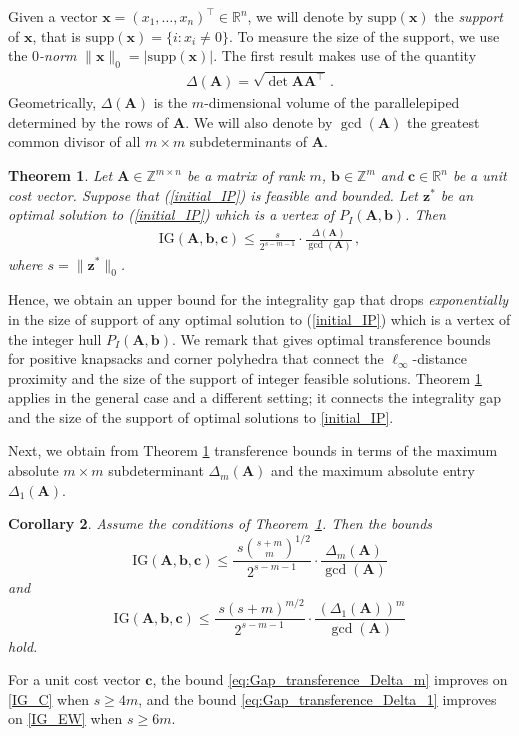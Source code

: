 \documentclass[runningheads]{llncs}
\newcommand{\ve}{\boldsymbol}
\newtheorem{thm}{Theorem}
\newtheorem{cor}[thm]{Corollary}
\newcommand{\be}{\begin{eqnarray}}
\newcommand{\bea}{\begin{eqnarray*}}
\newcommand{\ee}{\end{eqnarray}}
\newcommand{\eea}{\end{eqnarray*}}
\newcommand{\R}{\mathbb R}
\newcommand{\Z}{\mathbb Z}
\newcommand{\KP}{{P}}
\renewcommand\>{\rangle}
\newcommand\<{\langle}
\newcommand\0{\mathbf{0}}
\newcommand\supp{\mathrm{supp}}
\newcommand\bb{\ve b}%
\newcommand\cc{\ve c}%
\newcommand\zz{\ve z}%
\renewcommand\AA{\ve A}%
\newcommand\IG{\mathrm{IG}}%
\begin{document}
Given a vector ${\ve x}=(x_1,\ldots, x_n)^\top\in \R^n$, we will denote by $\supp({\ve x})$ the {\em support} of ${\ve x}$, that is $\supp({\ve x})=\{i: x_i\neq 0\}$. To measure the size of the support, we use the {\em $0$-norm} $\|{\ve x}\|_0=|\supp({\ve x})|$. The first result makes use of the quantity
\bea
\Delta(\AA)=\sqrt{\det \AA\AA^\top}\,.
\eea
Geometrically, $\Delta(\AA)$ is the $m$-dimensional volume of the parallelepiped determined by the rows of $\AA$.
We will also denote by $\gcd(\AA)$ the greatest common divisor of all $m\times m$ subdeterminants of $\AA$. 

%

%
\begin{thm} \label{thm_transference_gap_integer_hull} Let $\AA\in \Z^{m\times n}$ be a matrix of rank $m$, $\bb\in \Z^m$ and $\cc\in \R^n$ be a unit cost vector. Suppose that (\ref{initial_IP}) is feasible and bounded. Let $\zz^*$ be an optimal solution to (\ref{initial_IP}) which is a vertex of $\KP_I(\AA,\bb)$. Then 
%
 \be\label{Gap_transference_integer_hull} 
\IG(\AA,\bb,\cc)\le \frac{s}{2^{s-m-1}}\cdot\frac{\Delta(\AA)}{\gcd(\AA)}\,,
\ee
 where $s=\| {\ve z}^*\|_0$.
\end{thm}
%
Hence, we obtain an upper bound for the integrality gap that drops {\em exponentially} in the size of support of any optimal solution to (\ref{initial_IP}) which is a vertex of the integer hull $\KP_I(\AA,\bb)$.  We remark that  \cite{ACHW} gives optimal transference bounds for positive knapsacks and corner polyhedra that connect the $\ell_\infty$-distance proximity and the size of the support of integer feasible solutions. Theorem \ref{thm_transference_gap_integer_hull} applies in the general case and a different setting; it connects the integrality gap and the size of the support of optimal solutions to \eqref{initial_IP}.

Next, we obtain from Theorem \ref{thm_transference_gap_integer_hull}  transference bounds in terms of the maximum absolute $m\times m$ subdeterminant $\Delta_m(\AA)$ and the maximum absolute entry $\Delta_1(\AA)$.
%
\begin{cor}
\label{cor_gap_immediate} Assume the conditions of Theorem~\ref{thm_transference_gap_integer_hull}.  Then
the bounds
\begin{equation}
\IG(\AA,\bb,\cc)\le \frac{\; s\binom{s+m}{m}^{1/2}}{2^{s-m-1}}\cdot\frac{\Delta_m(\AA)}{\gcd(\AA)}\label{eq:Gap_transference_Delta_m}
\end{equation}
and 
\begin{equation}
\IG(\AA,\bb,\cc)\le \frac{\; s(s+m)^{m/2}}{2^{s-m-1}}\cdot\frac{\,(\Delta_1(\AA))^m}{\gcd(\AA)}\label{eq:Gap_transference_Delta_1}
\end{equation}
hold.
\end{cor}
%
For a unit cost vector ${\ve c}$, the bound \eqref{eq:Gap_transference_Delta_m} improves on \eqref{IG_C} when $s\geq 4m$, and the bound \eqref{eq:Gap_transference_Delta_1} improves on \eqref{IG_EW} when $s \geq 6m$.
%
\end{document}
